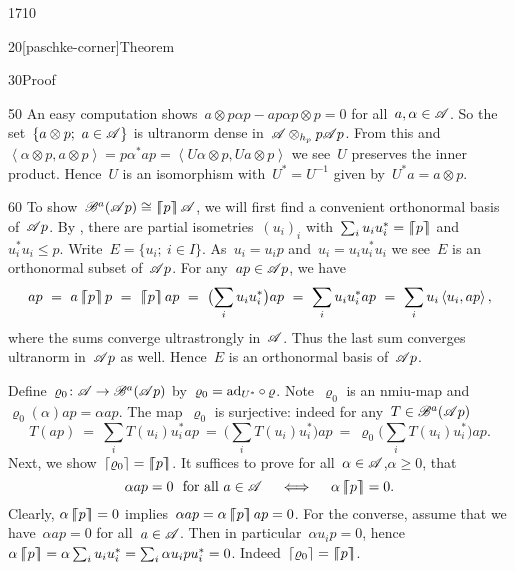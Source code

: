 \begin{parsec}{1710}
\begin{point}{20}[paschke-corner]{Theorem}
\begin{point}{30}{Proof}
\begin{point}{50}
An easy computation shows~$a \otimes p\alpha p - ap\alpha p \otimes p = 0$
    for all~$a, \alpha \in \mathscr{A}$.
So the set~$\{a \otimes p;\ a\in \mathscr{A}\}$
    is ultranorm dense in~$\mathscr{A} \otimes_{h_p} p \mathscr{A} p$.
From this and
    $\left<\alpha \otimes p, a\otimes p\right> = 
        p \alpha^* a p
        =\left< U \alpha \otimes p, U a \otimes p\right> $
        we see~$U$ preserves the inner product.
Hence~$U$ is an isomorphism with~$U^* = U^{-1}$
    given by~$U^* a = a\otimes p$.
\end{point}
\begin{point}{60}%
To show~$\mathscr{B}^a(\mathscr{A} p) \cong \left\lceil\!\!\left\lceil p\right\rceil\!\!\right\rceil\mathscr{A}$,
we will first find a convenient orthonormal basis of~$\mathscr{A} p$.
By ,
    there are partial isometries~$(u_i)_i$
    with~$\sum_i u_iu_i^* = \left\lceil\!\!\left\lceil p\right\rceil\!\!\right\rceil$
    and~$u_i^*u_i \leq p$.
Write~$E = \{u_i; \ i \in I\}$.
As~$u_i = u_i p$ and~$u_i= u_i u_i^* u_i$
    we see~$E$ is an orthonormal subset of~$\mathscr{A} p$.
For any~$ap \in \mathscr{A} p$, we have
\begin{equation*}
    ap \ =\  a \cceil{p} p
       \ =\  \cceil{p} a p
       \ = \ \bigl(\sum_i u_i u_i^*\bigr) ap
       \ = \ \sum_i u_i u_i^* ap
       \ = \ \sum_i u_i \left<u_i,ap\right>,
\end{equation*}
where the sums converge ultrastrongly in~$\mathscr{A}$.
Thus the last sum converges ultranorm in~$\mathscr{A} p$ as well.
Hence~$E$ is an orthonormal basis of~$\mathscr{A} p$.

Define~$\varrho_0 \colon \mathscr{A} \to \mathscr{B}^a(\mathscr{A} p)$
    by~$\varrho_0 = \mathrm{ad}_{U^*} \mathop{\circ} \varrho$.
Note~$\varrho_0$ is an nmiu-map and~$\varrho_0(\alpha)ap = \alpha ap$.
The map~$\varrho_0$ is surjective:
    indeed for any~$T \in \mathscr{B}^a(\mathscr{A} p)$
\begin{equation*}
    T (ap) \ = \ \sum_i T( u_i ) u_i^* ap
           \ = \ \bigl(\sum_i T( u_i ) u_i^*\bigr) ap
           \ = \ \varrho_0 \bigl(\sum_i T( u_i ) u_i^*\bigr) ap.
\end{equation*}
Next, we show~$\left\lceil\varrho_0\right\rceil = \left\lceil\!\!\left\lceil p\right\rceil\!\!\right\rceil$.
It suffices to prove for all~$\alpha \in \mathscr{A}$,$\alpha \geq 0$, that
\begin{equation*}
    \alpha ap = 0 \text{ \ for all\  } a\in \mathscr{A}
    \quad\iff \quad
    \alpha \left\lceil\!\!\left\lceil p\right\rceil\!\!\right\rceil = 0.
\end{equation*}
    Clearly,
    $\alpha \left\lceil\!\!\left\lceil p\right\rceil\!\!\right\rceil = 0$ implies~$\alpha ap = \alpha \left\lceil\!\!\left\lceil p\right\rceil\!\!\right\rceil ap= 0$.
For the converse, assume that we have~$\alpha ap = 0$ for all~$a\in\mathscr{A}$.
Then in particular~$\alpha u_ip = 0$,
    hence~$\alpha \left\lceil\!\!\left\lceil p\right\rceil\!\!\right\rceil = \alpha \sum_i u_iu_i^*  = \sum_i \alpha u_ipu_i^*=0$.
    Indeed~$\left\lceil\varrho_0\right\rceil = \left\lceil\!\!\left\lceil p\right\rceil\!\!\right\rceil$.


\end{point}
\end{point}
\end{point}
\end{parsec}
